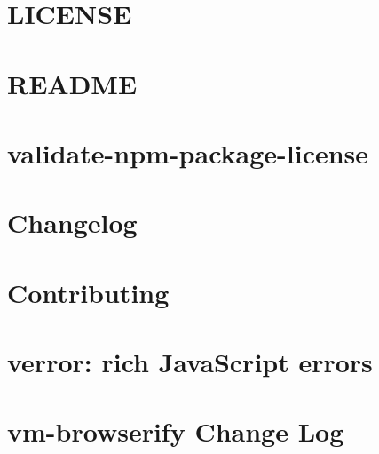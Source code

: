 \documentclass[twoside]{book}
\newcommand{\+}{\discretionary{\mbox{\scriptsize$\hookleftarrow$}}{}{}}
\begin{document}
\chapter{L\+I\+C\+E\+N\+SE}
\label{md_dsmacc_examples_DRmerge_node_modules_uuid_LICENSE}

\chapter{R\+E\+A\+D\+ME}
\label{md_dsmacc_examples_DRmerge_node_modules_uuid_README}

\chapter{validate-\/npm-\/package-\/license}
\label{md_dsmacc_examples_DRmerge_node_modules_validate-npm-package-license_README}

\chapter{Changelog}
\label{md_dsmacc_examples_DRmerge_node_modules_verror_CHANGES}

\chapter{Contributing}
\label{md_dsmacc_examples_DRmerge_node_modules_verror_CONTRIBUTING}

\chapter{verror\+: rich Java\+Script errors}
\label{md_dsmacc_examples_DRmerge_node_modules_verror_README}

\chapter{vm-\/browserify Change Log}
\label{md_dsmacc_examples_DRmerge_node_modules_vm-browserify_CHANGELOG}

\end{document}
